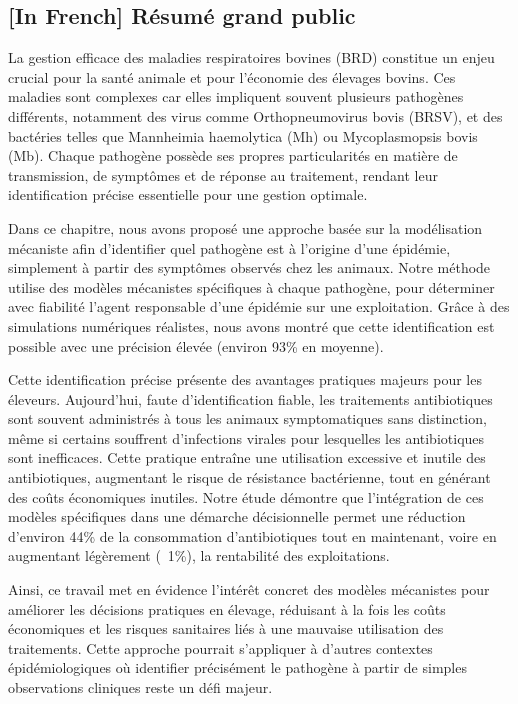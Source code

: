 \subsection{[In French] Résumé grand public}
La gestion efficace des maladies respiratoires bovines (BRD) constitue un enjeu crucial pour la santé animale et pour l’économie des élevages bovins. Ces maladies sont complexes car elles impliquent souvent plusieurs pathogènes différents, notamment des virus comme Orthopneumovirus bovis (BRSV), et des bactéries telles que Mannheimia haemolytica (Mh) ou Mycoplasmopsis bovis (Mb). Chaque pathogène possède ses propres particularités en matière de transmission, de symptômes et de réponse au traitement, rendant leur identification précise essentielle pour une gestion optimale.

Dans ce chapitre, nous avons proposé une approche basée sur la modélisation mécaniste afin d’identifier quel pathogène est à l’origine d’une épidémie, simplement à partir des symptômes observés chez les animaux. Notre méthode utilise des modèles mécanistes spécifiques à chaque pathogène, pour déterminer avec fiabilité l’agent responsable d’une épidémie sur une exploitation. Grâce à des simulations numériques réalistes, nous avons montré que cette identification est possible avec une précision élevée (environ 93\% en moyenne).

Cette identification précise présente des avantages pratiques majeurs pour les éleveurs. Aujourd'hui, faute d’identification fiable, les traitements antibiotiques sont souvent administrés à tous les animaux symptomatiques sans distinction, même si certains souffrent d’infections virales pour lesquelles les antibiotiques sont inefficaces. Cette pratique entraîne une utilisation excessive et inutile des antibiotiques, augmentant le risque de résistance bactérienne, tout en générant des coûts économiques inutiles. Notre étude démontre que l’intégration de ces modèles spécifiques dans une démarche décisionnelle permet une réduction d'environ 44\% de la consommation d’antibiotiques tout en maintenant, voire en augmentant légèrement (~1\%), la rentabilité des exploitations.

Ainsi, ce travail met en évidence l’intérêt concret des modèles mécanistes pour améliorer les décisions pratiques en élevage, réduisant à la fois les coûts économiques et les risques sanitaires liés à une mauvaise utilisation des traitements. Cette approche pourrait s’appliquer à d’autres contextes épidémiologiques où identifier précisément le pathogène à partir de simples observations cliniques reste un défi majeur.

